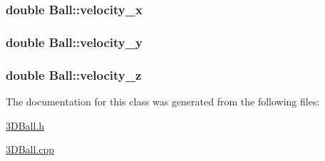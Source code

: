 \hypertarget{classBall_a6b84a62eb0d13d592472f9419151c25b}{
\subsubsection[{velocity\+\_\+x}]{\setlength{\rightskip}{0pt plus 5cm}double Ball\+::velocity\+\_\+x\hspace{0.3cm}{\ttfamily [private]}}}\label{classBall_a6b84a62eb0d13d592472f9419151c25b}
\hypertarget{classBall_aeadbe78353c1ea96e9cc0756ff7613fa}{
\subsubsection[{velocity\+\_\+y}]{\setlength{\rightskip}{0pt plus 5cm}double Ball\+::velocity\+\_\+y\hspace{0.3cm}{\ttfamily [private]}}}\label{classBall_aeadbe78353c1ea96e9cc0756ff7613fa}
\hypertarget{classBall_ae339b0f1007bb7e7e55bb60c356c889b}{
\subsubsection[{velocity\+\_\+z}]{\setlength{\rightskip}{0pt plus 5cm}double Ball\+::velocity\+\_\+z\hspace{0.3cm}{\ttfamily [private]}}}\label{classBall_ae339b0f1007bb7e7e55bb60c356c889b}


The documentation for this class was generated from the following files\+:\begin{DoxyCompactItemize}
\item 
\hyperlink{3DBall_8h}{3\+D\+Ball.\+h}\item 
\hyperlink{3DBall_8cpp}{3\+D\+Ball.\+cpp}\end{DoxyCompactItemize}
